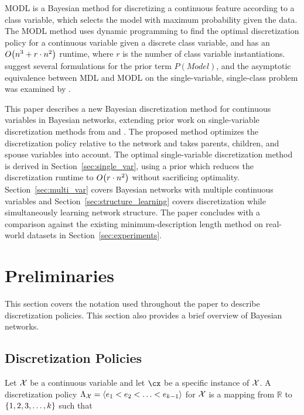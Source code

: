 MODL \citep{Boulle_2006} is a Bayesian method for discretizing a continuous feature according to a class variable, which selects the model with maximum probability given the data.
The MODL method uses dynamic programming to find the optimal discretization policy for a continuous variable given a discrete class variable, and has an $\bigo\paren{n^3 + r \cdot n^2}$ runtime, where $r$ is the number of class variable instantiations.
\cite{Lustgarten_2011} suggest several formulations for the prior term $P(\textit{Model})$, and the asymptotic equivalence between MDL and MODL on the single-variable, single-class problem was examined by \citet{VL_2000}.

This paper describes a new Bayesian discretization method for continuous variables in Bayesian networks, extending prior work on single-variable discretization methods from \citet{Boulle_2006} and \citet{Lustgarten_2011}.
The proposed method optimizes the discretization policy relative to the network and takes parents, children, and spouse variables into account.
The optimal single-variable discretization method is derived in Section~\ref{sec:single_var}, using a prior which reduces the discretization runtime to $\bigo\paren{r \cdot n^2}$ without sacrificing optimality.
Section~\ref{sec:multi_var} covers Bayesian networks with multiple continuous variables and Section~\ref{sec:structure_learning} covers discretization while simultaneously learning network structure.
The paper concludes with a comparison against the existing minimum-description length \citep{Friedman_1996} method on real-world datasets in Section~\ref{sec:experiments}.


\section{Preliminaries}
\label{sec:preliminaries}
This section covers the notation used throughout the paper to describe discretization policies.
This section also provides a brief overview of Bayesian networks.

\subsection{Discretization Policies}
\label{subsec:disc_policy}

Let $\mathcal{X}$ be a continuous variable and let $\cx$ be a specific instance of $\mathcal{X}$.
A discretization policy $\Lambda_{\mathcal{X}} = \langle e_1 < e_2 < \ldots < e_{k-1} \rangle$ for $\mathcal{X}$ is a mapping from $\mathbb{R}$ to $\curly{1,2,3,\ldots,k}$ such that

